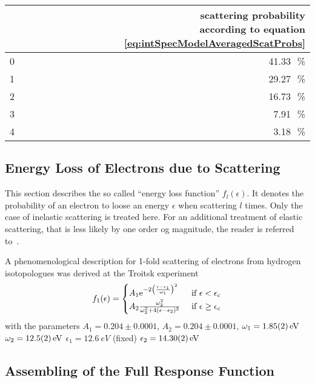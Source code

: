 \begin{table}[ht]
	\centering
	\begin{tabular}{cr}
		\toprule
		\makecell[tl]{scattering count $l$} &
		\makecell[tl]{scattering probability\\ according to equation \eqref{eq:intSpecModelAveragedScatProbs}}\\
		\hline
		0 & 41.33\,\SI{}{\percent }\\
		1 & 29.27\,\SI{}{\percent} \\
		2 & 16.73\,\SI{}{\percent} \\
		3 &  7.91\,\SI{}{\percent} \\
		4 &  3.18\,\SI{}{\percent} \\
		\bottomrule
	\end{tabular}
	\label{tab:intSpecModelAveragedScatProbs}
\end{table}

\subsection{Energy Loss of Electrons due to Scattering}
\label{sec:intSpecModelResponseEloss}
This section describes the so called ``energy loss function'' $f_l(\epsilon)$. It denotes the probability of an electron to loose an energy $\epsilon$ when scattering $l$ times. Only the case of inelastic scattering is treated here. For an additional treatment of elastic scattering, that is less likely by one order og magnitude, the reader is referred to~\cite{Kleesiek2019}.

A phenomenological description for 1-fold scattering of electrons from hydrogen isotopologues was derived at the Troitsk experiment~\cite{Aseev2000, Abdurashitov2017}
\newcommand{\epsCrit}{\epsilon_\mathrm{c}}
\begin{equation}
	f_1(\epsilon) =
	\begin{cases}
		A_1 
		\euler^{ 
			-2\left(
			\frac{\epsilon-\epsilon_1}{\omega_1}
			\right)^2
		}
		&\text{ if } \epsilon < \epsCrit \\
		A_2\frac{
			\omega_2^2
		}{
			\omega_2^2+4(\epsilon-\epsilon_2)^2
		} 
		&\text{ if } \epsilon \geq \epsCrit
	\end{cases}
\end{equation}
with the parameters 
$A_1=0.204\pm0.0001$, 
$A_2=0.204\pm0.0001$, 
$\omega_1=\SI{1.85\pm0.02}{eV}$
$\omega_2=\SI{12.5\pm0.2}{eV}$
$\epsilon_1=\SI{12.6}{eV}$ (fixed)
$\epsilon_2=\SI{14.30\pm0.02}{eV}$




\subsection{Assembling of the Full Response Function}
\label{sec:intSpecModelResponseReconciliation}

